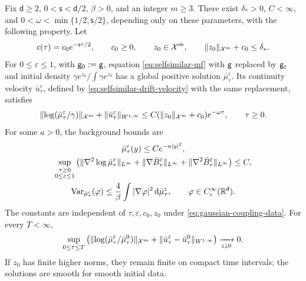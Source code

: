 \documentclass[11pt,reqno]{amsart}
\numberwithin{equation}{section}
\theoremstyle{plain}
\theoremstyle{remark}
\DeclarePairedDelimiter{\norm}{\lVert}{\rVert}
\renewcommand{\d}{\mathsf{d}}\newcommand{\s}{\mathsf{s}}
\newcommand{\Xspace}{\mathcal X}
\begin{document}
\begin{lemma}\label{lem:decaying-coupling}
Fix $\d\ge2$, $0<\s<\d/2$, $\beta>0$, and an integer $m\ge3$. There exist $\delta_*>0$, $C<\infty$, and $0<\omega<\min\{1/2,\s/2\}$, depending only on these parameters, with the following property. Let
\begin{equation}\label{eq:gaussian-coupling-data}
 c(\tau)=c_0e^{-\s\tau/2},\qquad c_0\ge0,\qquad
 z_0\in\Xspace^m,\qquad \norm{z_0}_{\Xspace^m}+c_0\le\delta_*.
\end{equation}
For $0\le\varepsilon\le1$, with $\mathsf g_0:=\mathsf g$, equation \eqref{eq:selfsimilar-mf} with $\mathsf g$ replaced by $\mathsf g_\varepsilon$ and initial density $\gamma e^{z_0}/\int\gamma e^{z_0}$ has a global positive solution $\bar\mu_\tau^\varepsilon$. Its continuity velocity $\bar u_\tau^\varepsilon$, defined by \eqref{eq:selfsimilar-drift-velocity} with the same replacement, satisfies
\begin{equation}\label{eq:gaussian-log-decay}
 \norm{\log(\bar\mu_\tau^\varepsilon/\gamma)}_{\Xspace^m}
   +\norm{\bar u_\tau^\varepsilon}_{W^{1,\infty}}
       \le C(\norm{z_0}_{\Xspace^m}+c_0)e^{-\omega\tau},\qquad \tau\ge0.
\end{equation}
For some $a>0$, the background bounds are
\begin{gather}
 \bar\mu_\tau^\varepsilon(y)\le Ce^{-a|y|^2},\label{eq:gaussian-background-density}\\
 \sup_{\substack{\tau\ge0\\0\le\varepsilon\le1}}
 \left(\norm{\nabla^2\log\bar\mu_\tau^\varepsilon}_{L^\infty}
 +\norm{\nabla\bar B_\tau^\varepsilon}_{L^\infty}
 +\norm{\nabla^2\bar B_\tau^\varepsilon}_{L^\infty}\right)\le C,
 \label{eq:gaussian-background-derivatives}\\
 \Var_{\bar\mu_\tau^\varepsilon}(\varphi)\le\frac4\beta
       \int|\nabla\varphi|^2\dd\bar\mu_\tau^\varepsilon,
       \qquad \varphi\in C_c^\infty(\R^\d).
 \label{eq:gaussian-background-poincare}
\end{gather}
The constants are independent of $\tau,\varepsilon,c_0,z_0$ under \eqref{eq:gaussian-coupling-data}. For every $T<\infty$,
\begin{equation}\label{eq:gaussian-cutoff-convergence}
 \sup_{0\le\tau\le T}\left(
 \norm{\log(\bar\mu_\tau^\varepsilon/\bar\mu_\tau^0)}_{\Xspace^m}
 +\norm{\bar u_\tau^\varepsilon-\bar u_\tau^0}_{W^{1,\infty}}\right)
 \xrightarrow[\varepsilon\downarrow0]{}0.
\end{equation}
If $z_0$ has finite higher norms, they remain finite on compact time intervals; the solutions are smooth for smooth initial data.
\end{lemma}
\end{document}
